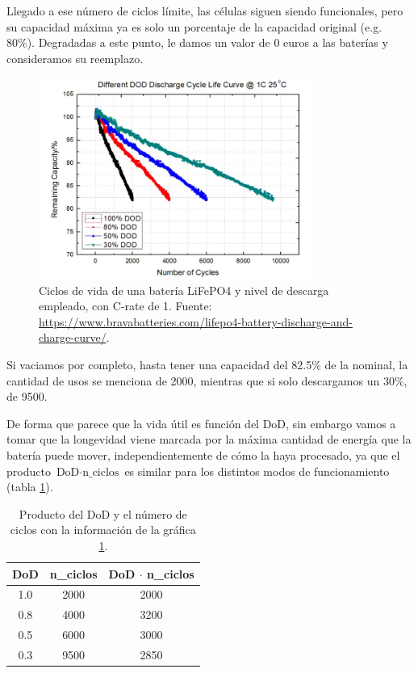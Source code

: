 Llegado a ese número de ciclos límite, las células siguen siendo funcionales,
pero su capacidad máxima ya es solo un porcentaje de la capacidad original
(e.g. 80\%). Degradadas a este punto, le damos un valor de 0 euros a las
baterías y consideramos su reemplazo.

\begin{figure}[h] \centering
	\centering
	\includegraphics[width=0.8\textwidth]{./capitulos/resultados_discusion/images/dod_vs_cycles_lifepo4.png}
	\caption{Ciclos de vida de una batería LiFePO4 y nivel de descarga empleado,
		con C-rate de 1. Fuente:
		\url{https://www.bravabatteries.com/lifepo4-battery-discharge-and-charge-curve/}.}
	\label{fig:dod_vs_cycles_lifepo4}
\end{figure}

Si vaciamos por completo, hasta tener una capacidad del 82.5\% de la nominal,
la cantidad de usos se menciona de 2000, mientras que si solo descargamos un
30\%, de 9500.

De forma que parece que la vida útil es función del DoD, sin embargo vamos a
tomar que la longevidad viene marcada por la máxima cantidad de energía que la
batería puede mover, independientemente de cómo la haya procesado, ya que el
producto $\text{DoD} \cdot \text{n\_ciclos}$ es similar para los distintos
modos de funcionamiento (tabla \ref{tab:DoD_results}).

\begin{table}[h]
	\centering
	\begin{tabular}{ccc}
		\toprule
		\textbf{DoD} & \textbf{n\_ciclos} & \textbf{DoD} $\cdot$ \textbf{n\_ciclos} \\
		\midrule
		1.0          & 2000               & 2000                                    \\
		0.8          & 4000               & 3200                                    \\
		0.5          & 6000               & 3000                                    \\
		0.3          & 9500               & 2850                                    \\
		\bottomrule
	\end{tabular}
	\caption{Producto del DoD y el número de ciclos con la información de la
		gráfica \ref{fig:dod_vs_cycles_lifepo4}.}
	\label{tab:DoD_results}
\end{table}


